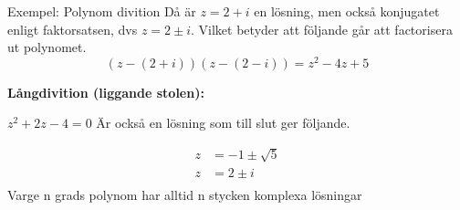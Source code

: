 \begin{multicols}{2}
\begin{exampleblock}{Exempel: Polynom divition}
Då är $z = 2 + i$ en lösning, men också konjugatet enligt faktorsatsen,
dvs $z = 2 \pm i$. Vilket betyder att följande går att factorisera ut polynomet.
\begin{equation*}
  (z -(2 + i))(z -(2 - i)) = z^2 - 4z + 5
\end{equation*}

\textbf{Långdivition (liggande stolen):}

$z^2 + 2z - 4 = 0$ Är också en lösning som till slut ger följande.

\begin{align*}
  z &= -1 \pm \sqrt{5} \\
  z &= 2 \pm i \\
\end{align*}
Varge n grads polynom har alltid n stycken komplexa lösningar
\end{exampleblock}
\end{multicols}
\raggedcolumns


